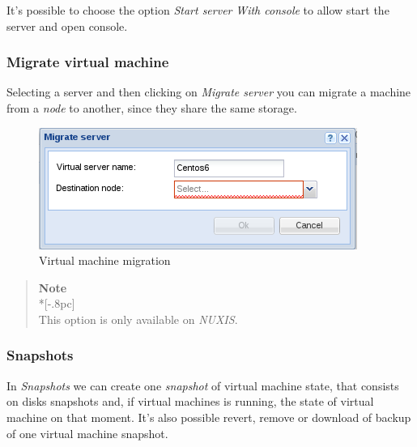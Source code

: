 It's possible to choose the option \emph{Start server} \emph{With console} to allow start the server and open console.

\subsubsection{Migrate virtual machine}
\label{sec:migrate_server}

Selecting a server and then clicking on \emph{Migrate server} you can migrate a machine from a \emph{node} to another, since they share the same storage.

\begin{figure}[H]
	\begin{center}
	\includegraphics[scale=0.5]{screenshots/server_migrate.png}
	\caption{Virtual machine migration}
	\label{fig:server_migrate}
	\end{center}
\end{figure}

\begin{quote}
	{\large \bf Note} \\*[-.8pc]
	\underline{\hspace{6in}} \\
	This option is only available on \emph{NUXIS}.
\end{quote}

\subsubsection{Snapshots}
\label{sec:server_snapshots}

In \emph{Snapshots} we can create one \emph{snapshot} of virtual machine state, that consists on disks snapshots and, if virtual machines is running, the state of virtual machine on that moment.
It's also possible revert, remove or download of backup of one virtual machine snapshot.

